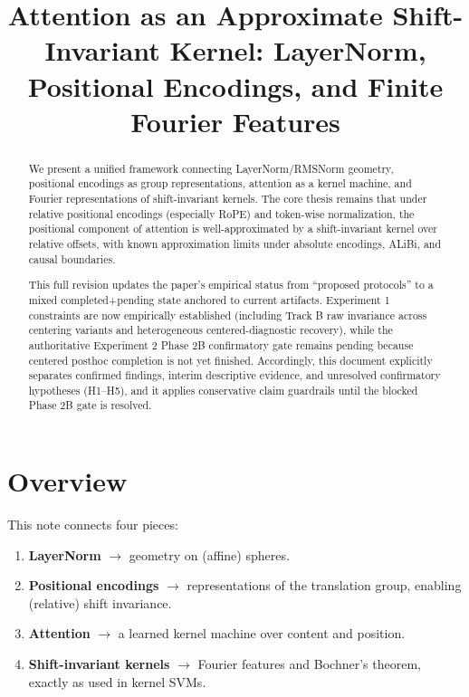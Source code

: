 \documentclass[11pt]{article}
\title{Attention as an Approximate Shift-Invariant Kernel: LayerNorm, Positional Encodings, and Finite Fourier Features}
\author{}
\date{}
\theoremstyle{definition}
\begin{document}
\maketitle

\begin{abstract}
We present a unified framework connecting LayerNorm/RMSNorm geometry, positional encodings as group representations, attention as a kernel machine, and Fourier representations of shift-invariant kernels. The core thesis remains that under relative positional encodings (especially RoPE) and token-wise normalization, the positional component of attention is well-approximated by a shift-invariant kernel over relative offsets, with known approximation limits under absolute encodings, ALiBi, and causal boundaries.

This full revision updates the paper's empirical status from ``proposed protocols'' to a mixed completed+pending state anchored to current artifacts. Experiment 1 constraints are now empirically established (including Track B raw invariance across centering variants and heterogeneous centered-diagnostic recovery), while the authoritative Experiment 2 Phase 2B confirmatory gate remains pending because centered posthoc completion is not yet finished. Accordingly, this document explicitly separates confirmed findings, interim descriptive evidence, and unresolved confirmatory hypotheses (H1--H5), and it applies conservative claim guardrails until the blocked Phase 2B gate is resolved.
\end{abstract}

\section{Overview}

This note connects four pieces:

\begin{enumerate}
    \item \textbf{LayerNorm} \(\rightarrow\) geometry on (affine) spheres.
    \item \textbf{Positional encodings} \(\rightarrow\) representations of the translation group, enabling (relative) shift invariance.
    \item \textbf{Attention} \(\rightarrow\) a learned kernel machine over content and position.
    \item \textbf{Shift-invariant kernels} \(\rightarrow\) Fourier features and Bochner's theorem, exactly as used in kernel SVMs.
\end{enumerate}
\end{document}
